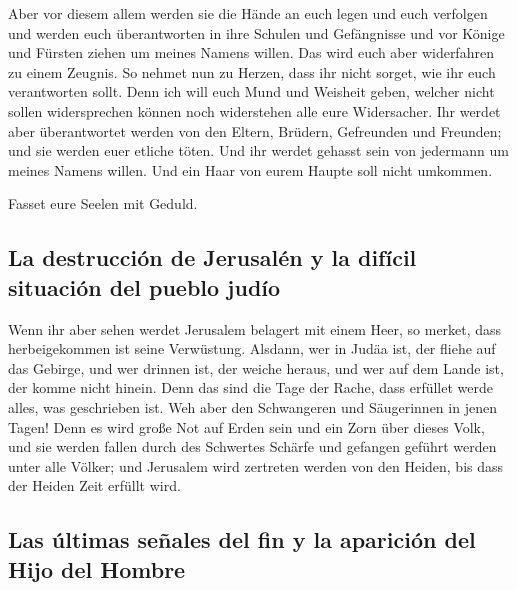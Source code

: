  Aber vor diesem allem werden sie die Hände an euch legen
und euch verfolgen und werden euch überantworten in ihre Schulen und
Gefängnisse und vor Könige und Fürsten ziehen um meines Namens willen.
 Das wird euch aber widerfahren zu einem Zeugnis.
 So nehmet nun zu Herzen, dass ihr nicht sorget, wie ihr
euch verantworten sollt.  Denn ich will euch Mund und
Weisheit geben, welcher nicht sollen widersprechen können noch
widerstehen alle eure Widersacher.  Ihr werdet aber
überantwortet werden von den Eltern, Brüdern, Gefreunden und Freunden;
und sie werden euer etliche töten.  Und ihr werdet
gehasst sein von jedermann um meines Namens willen.  Und
ein Haar von eurem Haupte soll nicht umkommen.

 Fasset eure Seelen mit Geduld.

\hypertarget{la-destrucciuxf3n-de-jerusaluxe9n-y-la-difuxedcil-situaciuxf3n-del-pueblo-juduxedo}{%
\subsection{La destrucción de Jerusalén y la difícil situación del
pueblo
judío}\label{la-destrucciuxf3n-de-jerusaluxe9n-y-la-difuxedcil-situaciuxf3n-del-pueblo-juduxedo}}

 Wenn ihr aber sehen werdet Jerusalem belagert mit einem
Heer, so merket, dass herbeigekommen ist seine Verwüstung.
 Alsdann, wer in Judäa ist, der fliehe auf das Gebirge,
und wer drinnen ist, der weiche heraus, und wer auf dem Lande ist, der
komme nicht hinein.  Denn das sind die Tage der Rache,
dass erfüllet werde alles, was geschrieben ist.  Weh aber
den Schwangeren und Säugerinnen in jenen Tagen! Denn es wird große Not
auf Erden sein und ein Zorn über dieses Volk,  und sie
werden fallen durch des Schwertes Schärfe und gefangen geführt werden
unter alle Völker; und Jerusalem wird zertreten werden von den Heiden,
bis dass der Heiden Zeit erfüllt wird.

\hypertarget{las-uxfaltimas-seuxf1ales-del-fin-y-la-apariciuxf3n-del-hijo-del-hombre}{%
\subsection{Las últimas señales del fin y la aparición del Hijo del
Hombre}\label{las-uxfaltimas-seuxf1ales-del-fin-y-la-apariciuxf3n-del-hijo-del-hombre}}

